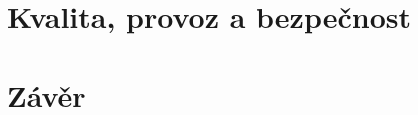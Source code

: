 \documentclass[12pt, a4paper]{report}
\begin{document}
\part{Kvalita, provoz a bezpečnost}




\part{Závěr}


\appendix




\cleardoublepage
{}
\end{document}
